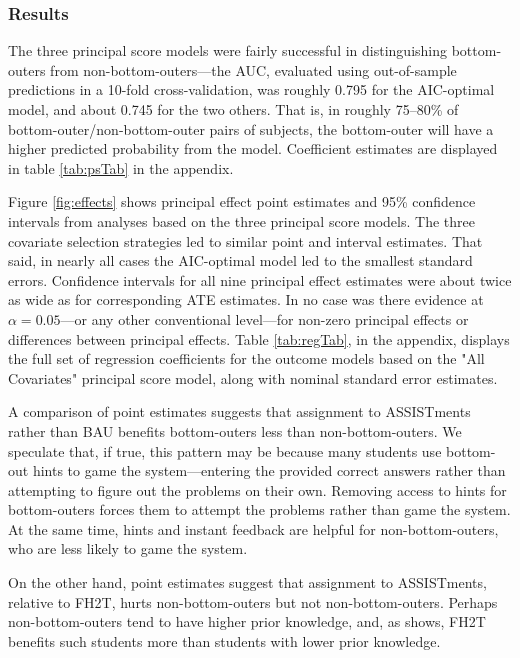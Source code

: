 \documentclass[]{article}
\begin{document}

\subsubsection{Results}

The three principal score models were fairly successful in distinguishing bottom-outers from non-bottom-outers---the AUC, evaluated using out-of-sample predictions in a 10-fold cross-validation, was roughly 0.795 for the AIC-optimal model, and about 0.745 for the two others. That is, in roughly 75--80\% of bottom-outer/non-bottom-outer pairs of subjects, the bottom-outer will have a higher predicted probability from the model.
Coefficient estimates are displayed in table \ref{tab:psTab} in the appendix.

Figure \ref{fig:effects} shows principal effect point estimates and 95\% confidence intervals from analyses based on the three principal score models.
The three covariate selection strategies led to similar point and interval estimates.
That said, in nearly all cases the AIC-optimal model led to the smallest standard errors.
Confidence intervals for all nine principal effect estimates were about twice as wide as for corresponding ATE estimates.
In no case was there evidence at $\alpha=0.05$---or any other conventional level---for non-zero principal effects or differences between principal effects.
Table \ref{tab:regTab}, in the appendix, displays the full set of regression coefficients for the outcome models based on the "All Covariates" principal score model, along with nominal standard error estimates.

A comparison of point estimates suggests that assignment to ASSISTments rather than BAU benefits bottom-outers less than non-bottom-outers.
We speculate that, if true, this pattern may be because many students use bottom-out hints to game the system---entering the provided correct answers rather than attempting to figure out the problems on their own.
Removing access to hints for bottom-outers forces them to attempt the problems rather than game the system.
At the same time, hints and instant feedback are helpful for non-bottom-outers, who are less likely to game the system.

On the other hand, point estimates suggest that assignment to ASSISTments, relative to FH2T, hurts non-bottom-outers but not non-bottom-outers.
Perhaps non-bottom-outers tend to have higher prior knowledge, and, as \cite{impactPaper} shows, FH2T benefits such students more than students with lower prior knowledge.
\end{document}
